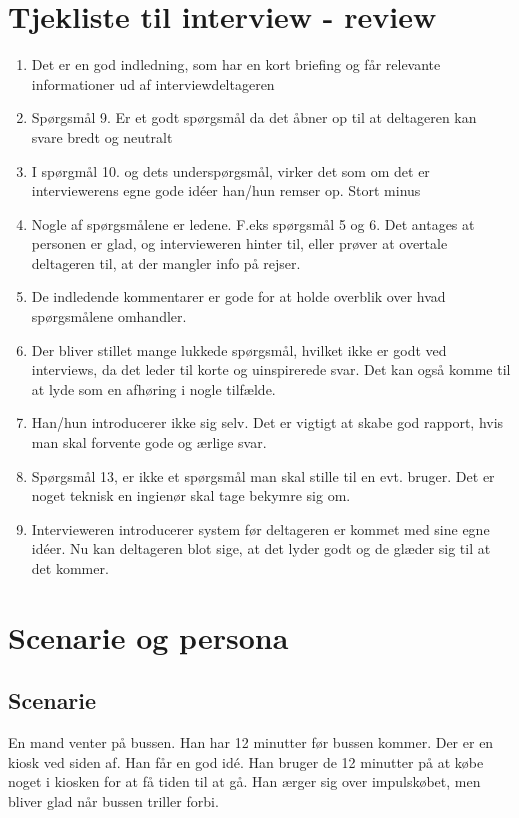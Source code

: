 \documentclass[12pt,a4paper,oneside]{article}
\begin{document}
\section{Tjekliste til interview - review}

\begin{enumerate}
\item{Det er en god indledning, som har en kort briefing og får relevante informationer ud af interviewdeltageren}
\item{Spørgsmål 9. Er et godt spørgsmål da det åbner op til at deltageren kan svare bredt og neutralt}
\item{I spørgmål 10. og dets underspørgsmål, virker det som om det er interviewerens egne gode idéer han/hun remser op. Stort minus}
\item{Nogle af spørgsmålene er ledene. F.eks spørgsmål 5 og 6. Det antages at personen er glad, og intervieweren hinter til, eller prøver at overtale deltageren til, at der mangler info på rejser.}
\item{De indledende kommentarer er gode for at holde overblik over hvad spørgsmålene omhandler.}
\item{Der bliver stillet mange lukkede spørgsmål, hvilket ikke er godt ved interviews, da det leder til korte og uinspirerede svar. Det kan også komme til at lyde som en afhøring i nogle tilfælde.}
\item{Han/hun introducerer ikke sig selv. Det er vigtigt at skabe god rapport, hvis man skal forvente gode og ærlige svar.}
\item{Spørgsmål 13, er ikke et spørgsmål man skal stille til en evt. bruger. Det er noget teknisk en ingienør skal tage bekymre sig om.}
\item{Intervieweren introducerer system før deltageren er kommet med sine egne idéer. Nu kan deltageren blot sige, at det lyder godt og de glæder sig til at det kommer.}

\end{enumerate}

\section{Scenarie og persona}

\subsection{Scenarie}

En mand venter på bussen. Han har 12 minutter før bussen kommer. Der er en kiosk ved siden af. Han får en god idé. Han bruger de 12 minutter på at købe noget i kiosken for at få tiden til at gå. Han ærger sig over impulskøbet, men bliver glad når bussen triller forbi.
\end{document}
